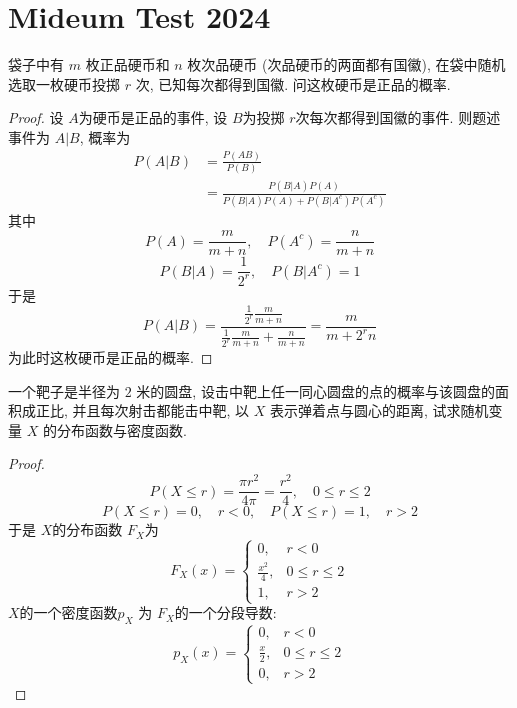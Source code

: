 \documentclass[../main.tex]{subfiles}
\begin{document}
\ifSubfilesClassLoaded{

    
}{}

\chapter{ Mideum Test 2024 }
\begin{exercise}{}{}
袋子中有 $m$ 枚正品硬币和 $n$ 枚次品硬币 (次品硬币的两面都有国徽), 在袋中随机选取一枚硬币投掷 $r$ 次, 已知每次都得到国徽. 问这枚硬币是正品的概率.
\end{exercise}
\begin{proof}
    设 \(  A  \)为硬币是正品的事件,  设 \(  B  \)为投掷 \(  r  \)次每次都得到国徽的事件. 则题述事件为 \(  A|B  \), 概率为 \[
    \begin{aligned}
    P\left( A|B \right)&= \frac{P\left( AB \right)  }{P\left( B \right)  }\\ 
     &= \frac{P\left( B|A \right)P\left( A \right)   }{P\left( B|A \right)P\left( A \right) + P\left( B|A^{c} \right)P\left( A^{c} \right)    }    
    \end{aligned}
    \] 其中 \[
    P\left( A \right)= \frac{m }{m+ n },\quad P\left( A^{c} \right)= \frac{n }{m+ n }    
    \] \[
    P\left( B|A \right) = \frac{1 }{2^{r} },\quad P\left( B|A^{c} \right)= 1  
    \]于是 \[
    P\left( A|B \right)= \frac{\frac{1 }{2^{r} }\frac{m }{m+ n }   }{ \frac{1 }{2^{r} }\frac{m }{m+ n }  + \frac{n }{m+ n } }= \frac{m }{m+ 2^{r}n }   
    \]为此时这枚硬币是正品的概率.
\end{proof}
\begin{exercise}{}{}
一个靶子是半径为 $2$ 米的圆盘, 设击中靶上任一同心圆盘的点的概率与该圆盘的面积成正比, 并且每次射击都能击中靶, 以 $X$ 表示弹着点与圆心的距离, 试求随机变量 $X$ 的分布函数与密度函数.
\end{exercise}
\begin{proof}
     \[
     P\left( X\le r \right)=  \frac{ \pi r^{2} }{ 4 \pi }= \frac{r^{2} }{4 }  ,\quad  0\le r\le 2
     \] \[
     P\left( X\le r \right)= 0,\quad r< 0,\quad P\left( X\le r \right)= 1,\quad r> 2  
     \]于是 \(  X  \)的分布函数 \(  F_{X}  \)为 \[
     F_{X}\left( x \right)= \begin{cases} 0,&r< 0\\ 
      \frac{x^{2} }{4 },& 0\le r\le 2\\ 
       1,&r> 2  \end{cases}  
     \]  \(  X  \)的一个密度函数\(  p_{X}  \) 为 \(  F_{X}  \)的一个分段导数:  \[
     p_{X}\left( x \right)= \begin{cases} 0,&r< 0\\ 
      \frac{x }{2 },& 0\le r\le 2\\ 
       0,&r> 2  \end{cases}  
     \] 
\end{proof}
\end{document}
